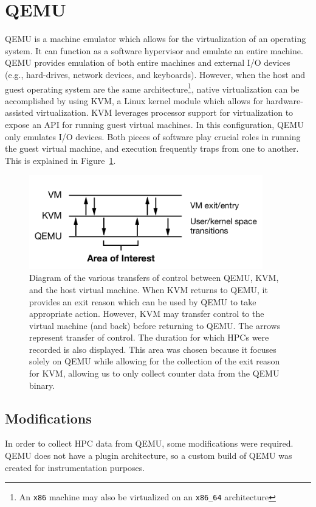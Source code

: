 \documentclass[notitlepage]{article}
\begin{document}
\section{QEMU}
\label{sec:qemu}
QEMU is a machine emulator which allows for the virtualization of an operating
system. It can function as a software hypervisor and emulate an entire machine.
QEMU provides emulation of both entire machines and external I/O devices (e.g.,
hard-drives, network devices, and keyboards). However, when the host and guest
operating system are the same architecture\footnote{An \texttt{x86} machine may
also be virtualized on an \texttt{x86\_64} architecture}, native virtualization
can be accomplished by using KVM, a Linux kernel module which allows for
hardware-assisted virtualization. KVM leverages processor support for
virtualization to expose an API for running guest virtual machines. In this
configuration, QEMU only emulates I/O devices.  Both pieces of software play
crucial roles in running the guest virtual machine, and execution frequently
traps from one to another. This is explained in Figure~\ref{fig:qemutrap}.

\begin{figure}
    \centering    
    \includegraphics[width=4in]{qemu_trap.pdf}
    \caption{Diagram of the various transfers of control between QEMU, KVM, and
        the host virtual machine. When KVM returns to QEMU, it provides an exit
        reason which can be used by QEMU to take appropriate action. However,
        KVM may transfer control to the virtual machine (and back) before
        returning to QEMU. The arrows represent transfer of control. The
        duration for which HPCs were recorded is also displayed. This area was
        chosen because it focuses solely on QEMU while allowing for the
        collection of the exit reason for KVM, allowing us to only collect
    counter data from the QEMU binary.}
\label{fig:qemutrap}
\end{figure}

\subsection{Modifications}
In order to collect HPC data from QEMU, some modifications were required. QEMU
does not have a plugin architecture, so a custom build of QEMU was created for
instrumentation purposes.
\end{document}
